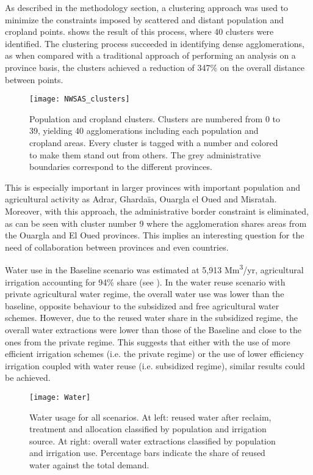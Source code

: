 As described in the methodology section, a clustering approach was used to minimize the constraints imposed by scattered and distant population and cropland points.  shows the result of this process, where 40 clusters were identified. The clustering process succeeded in identifying dense agglomerations, as when compared with a traditional approach of performing an analysis on a province basis, the clusters achieved a reduction of 347\% on the overall distance between points.

\begin{figure}[!ht]
    \centering
	\texttt{[image: NWSAS\_clusters]}
	\caption{Population and cropland clusters. Clusters are numbered from 0 to 39, yielding 40 agglomerations including each population and cropland areas. Every cluster is tagged with a number and colored to make them stand out from others. The grey administrative boundaries correspond to the different provinces.}
	\label{fig:clusters}
\end{figure}

This is especially important in larger provinces with important population and agricultural activity as Adrar, Ghardaïa, Ouargla el Oued and Misratah. Moreover, with this approach, the administrative border constraint is eliminated, as can be seen with cluster number 9 where the agglomeration shares areas from the Ouargla and El Oued provinces. This implies an interesting question for the need of collaboration between provinces and even countries.

Water use in the Baseline scenario was estimated at 5,913 Mm\textsuperscript{3}/yr, agricultural irrigation accounting for 94\% share (see ). In the water reuse scenario with private agricultural water regime, the overall water use was lower than the baseline, opposite behaviour to the subsidized and free agricultural water schemes. However, due to the reused water share in the subsidized regime, the overall water extractions were lower than those of the Baseline and close to the ones from the private regime. This suggests that either with the use of more efficient irrigation schemes (i.e. the private regime) or the use of lower efficiency irrigation coupled with water reuse (i.e. subsidized regime), similar results could be achieved.

\begin{figure}[!ht]
	\centering
	\texttt{[image: Water]}
	\caption{Water usage for all scenarios. At left: reused water after reclaim, treatment and allocation classified by population and irrigation source. At right: overall water extractions classified by population and irrigation use. Percentage bars indicate the share of reused water against the total demand.}
	\label{fig:water}
\end{figure}


